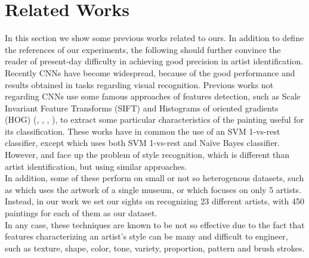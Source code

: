 \documentclass{article}
\begin{document}
\section{Related Works}\label{relwor}

In this section we show some previous works related to ours. In addition to define the references of our experiments, the following should further convince the reader of present-day difficulty in achieving good precision in artist identification.\\
Recently CNNs have become widespread, because of the good performance and results obtained in tasks regarding visual recognition.
Previous works not regarding CNNs use some famous approaches of features detection, such as Scale Invariant Feature Transforms (SIFT) and Histograms of oriented gradients (HOG) (\cite{Saleh2015}, \cite{mensink2014}, \cite{lombardi05}, \cite{jou2011}), to extract some particular characteristics of the painting useful for its classification. These works have in common the use of an SVM 1-vs-rest classifier, except \cite{jou2011} which uses both SVM 1-vs-rest and Naïve Bayes classifier. However, \cite{lombardi05} and \cite{jou2011} face up the problem of style recognition, which is different than artist identification, but using similar approaches.\\
In addition, some of these perform on small or not so heterogenous datasets, such as \cite{mensink2014} which uses the artwork of a single museum, or \cite{jou2011} which focuses on only 5 artists. Instead, in our work we set our sights on recognizing 23 different artists, with 450 paintings for each of them as our dataset. \\
In any case, these techniques are known to be not so effective due to the fact that features characterizing an artist's style can be many and difficult to engineer, such as texture, shape, color, tone, variety, proportion, pattern and brush strokes.\\
\end{document}
